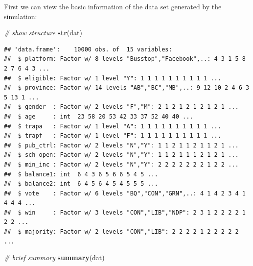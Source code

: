 \documentclass[
]{article}
\newenvironment{Shaded}{\begin{snugshade}}{\end{snugshade}}
\newcommand{\CommentTok}[1]{\textcolor[rgb]{0.56,0.35,0.01}{\textit{#1}}}
\newcommand{\KeywordTok}[1]{\textcolor[rgb]{0.13,0.29,0.53}{\textbf{#1}}}
\newcommand{\NormalTok}[1]{#1}
\begin{document}
First we can view the basic information of the data set generated by the
simulation:

\begin{Shaded}
\begin{Highlighting}[]
\CommentTok{# show structure}
\KeywordTok{str}\NormalTok{(dat)}
\end{Highlighting}
\end{Shaded}

\begin{verbatim}
## 'data.frame':    10000 obs. of  15 variables:
##  $ platform: Factor w/ 8 levels "Busstop","Facebook",..: 4 3 1 5 8 2 7 6 4 3 ...
##  $ eligible: Factor w/ 1 level "Y": 1 1 1 1 1 1 1 1 1 1 ...
##  $ province: Factor w/ 14 levels "AB","BC","MB",..: 9 12 10 2 4 6 3 5 13 1 ...
##  $ gender  : Factor w/ 2 levels "F","M": 2 1 2 1 2 1 2 1 2 1 ...
##  $ age     : int  23 58 20 53 42 33 37 52 40 40 ...
##  $ trapa   : Factor w/ 1 level "A": 1 1 1 1 1 1 1 1 1 1 ...
##  $ trapf   : Factor w/ 1 level "F": 1 1 1 1 1 1 1 1 1 1 ...
##  $ pub_ctrl: Factor w/ 2 levels "N","Y": 1 1 2 1 1 2 1 1 2 1 ...
##  $ sch_open: Factor w/ 2 levels "N","Y": 1 1 2 1 1 1 2 1 2 1 ...
##  $ min_inc : Factor w/ 2 levels "N","Y": 2 2 2 2 2 2 2 1 2 2 ...
##  $ balance1: int  6 4 3 6 5 6 6 5 4 5 ...
##  $ balance2: int  6 4 5 6 4 5 4 5 5 5 ...
##  $ vote    : Factor w/ 6 levels "BQ","CON","GRN",..: 4 1 4 2 3 4 1 4 4 4 ...
##  $ win     : Factor w/ 3 levels "CON","LIB","NDP": 2 3 1 2 2 2 2 1 2 2 ...
##  $ majority: Factor w/ 2 levels "CON","LIB": 2 2 2 2 1 2 2 2 2 2 ...
\end{verbatim}

\begin{Shaded}
\begin{Highlighting}[]
\CommentTok{# brief summary}
\KeywordTok{summary}\NormalTok{(dat)}
\end{Highlighting}
\end{Shaded}
\end{document}
